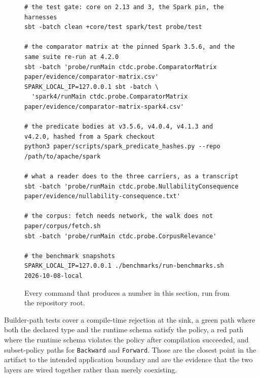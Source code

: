 \begin{figure}[t]
\scriptsize
\begin{verbatim}
# the test gate: core on 2.13 and 3, the Spark pin, the harnesses
sbt -batch clean +core/test spark/test probe/test

# the comparator matrix at the pinned Spark 3.5.6, and the same suite re-run at 4.2.0
sbt -batch 'probe/runMain ctdc.probe.ComparatorMatrix paper/evidence/comparator-matrix.csv'
SPARK_LOCAL_IP=127.0.0.1 sbt -batch \
  'spark4/runMain ctdc.probe.ComparatorMatrix paper/evidence/comparator-matrix-spark4.csv'

# the predicate bodies at v3.5.6, v4.0.4, v4.1.3 and v4.2.0, hashed from a Spark checkout
python3 paper/scripts/spark_predicate_hashes.py --repo /path/to/apache/spark

# what a reader does to the three carriers, as a transcript
sbt -batch 'probe/runMain ctdc.probe.NullabilityConsequence paper/evidence/nullability-consequence.txt'

# the corpus: fetch needs network, the walk does not
paper/corpus/fetch.sh
sbt -batch 'probe/runMain ctdc.probe.CorpusRelevance'

# the benchmark snapshots
SPARK_LOCAL_IP=127.0.0.1 ./benchmarks/run-benchmarks.sh 2026-10-08-local
\end{verbatim}
\caption{Every command that produces a number in this section, run from the repository root.}
\label{fig:reproduce}
\end{figure} Builder-path tests cover a compile-time rejection at the sink, a green path where both the declared type and the runtime schema satisfy the policy, a red path where the runtime schema violates the policy after compilation succeeded, and subset-policy paths for \texttt{Backward} and \texttt{Forward}. Those are the closest point in the artifact to the intended application boundary and are the evidence that the two layers are wired together rather than merely coexisting.
